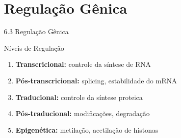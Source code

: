 \section{Regulação Gênica}

\begin{frame}[shrink=10]{6.3 Regulação Gênica}
\begin{block}{Níveis de Regulação}
\begin{enumerate}
    \item \textbf{Transcricional:} controle da síntese de RNA
    \item \textbf{Pós-transcricional:} splicing, estabilidade do mRNA
    \item \textbf{Traducional:} controle da síntese proteica
    \item \textbf{Pós-traducional:} modificações, degradação
    \item \textbf{Epigenética:} metilação, acetilação de histonas
\end{enumerate}
\end{block}

\vspace{0.3cm}

\end{frame}

